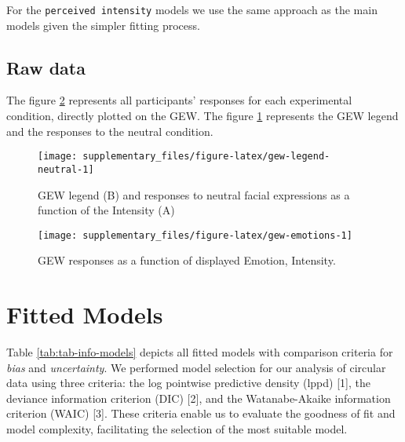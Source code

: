 \documentclass[
]{article}
\begin{document}
For the \texttt{perceived\ intensity} models we use the same approach as the main models given the simpler fitting process.

\hypertarget{raw-data}{%
\subsection{Raw data}\label{raw-data}}

The figure \ref{fig:gew-emotions} represents all participants' responses for each experimental condition, directly plotted on the GEW. The figure \ref{fig:gew-legend-neutral} represents the GEW legend and the responses to the neutral condition.

\begin{figure}

{\centering \texttt{[image: supplementary\_files/figure-latex/gew-legend-neutral-1]} 

}

\caption{GEW legend (B) and responses to neutral facial expressions as a function of the Intensity (A)}\label{fig:gew-legend-neutral}
\end{figure}

\newpage
\begin{landscape}

\begin{figure}

{\centering \texttt{[image: supplementary\_files/figure-latex/gew-emotions-1]} 

}

\caption{GEW responses as a function of displayed Emotion, Intensity.}\label{fig:gew-emotions}
\end{figure}

\end{landscape}

\hypertarget{fitted-models}{%
\section{Fitted Models}\label{fitted-models}}

Table \ref{tab:tab-info-models} depicts all fitted models with comparison criteria for \emph{bias} and \emph{uncertainty}.
We performed model selection for our analysis of circular data using three criteria: the log pointwise predictive density (lppd) {[}1{]}, the deviance information criterion (DIC) {[}2{]}, and the Watanabe-Akaike information criterion (WAIC) {[}3{]}. These criteria enable us to evaluate the goodness of fit and model complexity, facilitating the selection of the most suitable model.
\end{document}
